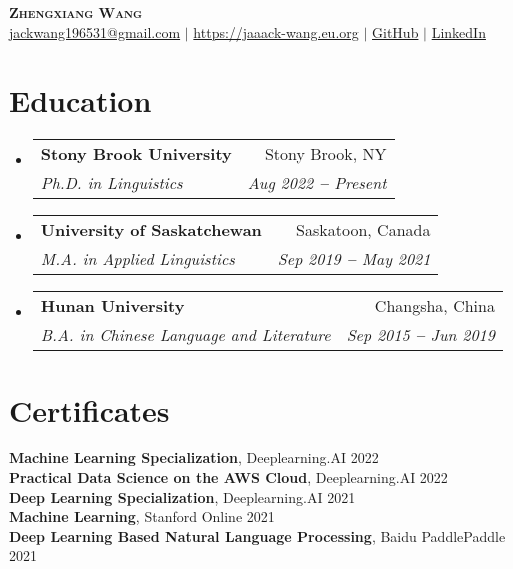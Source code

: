 \documentclass[letterpaper,11pt]{article}
\makeatletter
\newcommand{\resumeSubheading}[4]{
  \vspace{-2pt}\item
    \begin{tabular*}{0.97\textwidth}[t]{l@{\extracolsep{\fill}}r}
      \textbf{#1} & #2 \\
      \textit{\small#3} & \textit{\small #4} \\
    \end{tabular*}\vspace{-7pt}
}
\newcommand{\resumeSubHeadingListStart}{\begin{itemize}[leftmargin=0.15in, label={}]}
\newcommand{\resumeSubHeadingListEnd}{\end{itemize}}
\makeatother
\begin{document}

\begin{center}
    \textbf{\Huge \scshape Zhengxiang Wang} \\ \vspace{3pt}
    \small
    \faEnvelope \hspace{.5pt} \href{mailto:jackwang196531@gmail.com}{jackwang196531@gmail.com}
    $|$
    \faHome \hspace{.5pt} \href{https://jaaack-wang.eu.org}{https://jaaack-wang.eu.org}
    $|$
    \faGithub \hspace{.5pt} \href{https://github.com/jaaack-wang}{GitHub}
    $|$
    \faLinkedinSquare \hspace{.5pt} \href{https://www.linkedin.com/in/zhengxiang-wang-560735191/}{LinkedIn}
    
\end{center}



\section{Education}
  \resumeSubHeadingListStart
    
    \resumeSubheading
      {Stony Brook University}{Stony Brook, NY}
      {Ph.D. in Linguistics}{Aug 2022 \textbf{--} Present}

    \vspace{3pt}
    \resumeSubheading
      {University of Saskatchewan}{Saskatoon, Canada}
      {M.A. in Applied Linguistics}{Sep 2019 \textbf{--} May 2021}
      
    \vspace{3pt}
    \resumeSubheading
      {Hunan University}{Changsha, China}
      {B.A. in Chinese Language and Literature}{Sep 2015 \textbf{--} Jun 2019}
    
  \resumeSubHeadingListEnd



\section{Certificates}
  \resumeSubHeadingListStart
    \small{\item{
        \textbf{Machine Learning Specialization}, Deeplearning.AI \hfill 2022 \\ \vspace{1pt}
        \textbf{Practical Data Science on the AWS Cloud}, Deeplearning.AI \hfill 2022 \\ \vspace{1pt}
        \textbf{Deep Learning Specialization}, Deeplearning.AI \hfill 2021 \\ \vspace{1pt}
        \textbf{Machine Learning}, Stanford Online \hfill 2021 \\ \vspace{1pt}
        \textbf{Deep Learning Based Natural Language Processing}, Baidu PaddlePaddle \hfill 2021
    }} \\ \vspace{-5pt}
  \resumeSubHeadingListEnd
 
\end{document}
